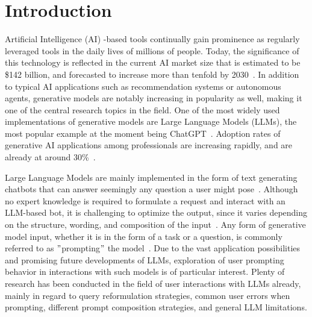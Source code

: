 \section{Introduction}
\label{sec:introduction}

\sloppy %
Artificial Intelligence (AI) -based tools continually gain prominence as regularly leveraged tools in the
daily lives of millions of people.
Today, the significance of this technology is reflected in the current AI market size that is
estimated to be \$142 billion, and forecasted to increase more than tenfold by 2030~\cite{statista_artificial_2023}.
In addition to typical AI applications such as recommendation systems or autonomous agents, generative
models are notably increasing in popularity as well, making it one of the central research topics
in the field.
One of the most widely used implementations of generative models are Large Language Models (LLMs),
the most popular example at the moment being ChatGPT~\cite{openai_chatgpt_2023}.
Adoption rates of generative AI applications among professionals are increasing rapidly, and are
already at around 30\%~\cite{statista_us_2022}.

Large Language Models are mainly implemented in the form of text generating chatbots that can
answer seemingly any question a user might pose~\cite{ge_openagi_2023}.
Although no expert knowledge is required to formulate a request and interact with an LLM-based bot, it is challenging to optimize the output, since it varies depending on the structure, wording,
and composition of the input~\cite{radford_improving_2018}.
Any form of generative model input, whether it is in the form of a task or a question, is
commonly referred to as \("\)prompting\("\) the model~\cite[p. 1]{white_prompt_2023}.
Due to the vast application possibilities and promising future developments of LLMs, exploration of
user prompting behavior in interactions with such models is of particular interest.
Plenty of research has been conducted in the field of user interactions with LLMs already,
mainly in regard to query reformulation strategies, common user errors when prompting,
different prompt composition strategies, and general LLM limitations.

